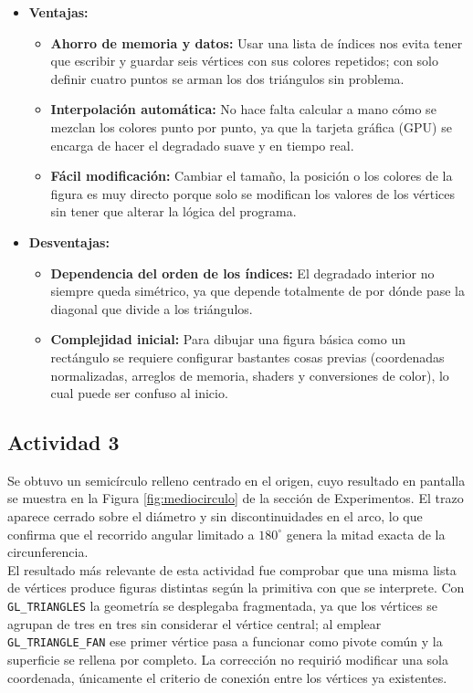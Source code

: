 \begin{itemize}
    \item \textbf{Ventajas:} 
    \begin{itemize}
        \item \textbf{Ahorro de memoria y datos:} Usar una lista de índices nos evita tener que escribir y guardar seis vértices con sus colores repetidos; con solo definir cuatro puntos se arman los dos triángulos sin problema.
        \item \textbf{Interpolación automática:} No hace falta calcular a mano cómo se mezclan los colores punto por punto, ya que la tarjeta gráfica (GPU) se encarga de hacer el degradado suave y en tiempo real.
        \item \textbf{Fácil modificación:} Cambiar el tamaño, la posición o los colores de la figura es muy directo porque solo se modifican los valores de los vértices sin tener que alterar la lógica del programa.
    \end{itemize}
    
    \item \textbf{Desventajas:}
    \begin{itemize}
        \item \textbf{Dependencia del orden de los índices:} El degradado interior no siempre queda simétrico, ya que depende totalmente de por dónde pase la diagonal que divide a los triángulos.
        \item \textbf{Complejidad inicial:} Para dibujar una figura básica como un rectángulo se requiere configurar bastantes cosas previas (coordenadas normalizadas, arreglos de memoria, shaders y conversiones de color), lo cual puede ser confuso al inicio.
    \end{itemize}
\end{itemize}

\subsection{Actividad 3}

Se obtuvo un semicírculo relleno centrado en el origen, cuyo resultado en pantalla se muestra en la Figura \ref{fig:mediocirculo} de la sección de Experimentos. El trazo aparece cerrado sobre el diámetro y sin discontinuidades en el arco, lo que confirma que el recorrido angular limitado a $180^\circ$ genera la mitad exacta de la circunferencia.\\

El resultado más relevante de esta actividad fue comprobar que una misma lista de vértices produce figuras distintas según la primitiva con que se interprete. Con \texttt{GL\_TRIANGLES} la geometría se desplegaba fragmentada, ya que los vértices se agrupan de tres en tres sin considerar el vértice central; al emplear \texttt{GL\_TRIANGLE\_FAN} ese primer vértice pasa a funcionar como pivote común y la superficie se rellena por completo. La corrección no requirió modificar una sola coordenada, únicamente el criterio de conexión entre los vértices ya existentes.\\

